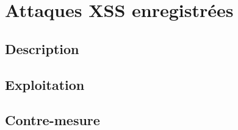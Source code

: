 \section{Attaques XSS enregistrées }

\subsection{Description}

\subsection{Exploitation}

\subsection{Contre-mesure}


